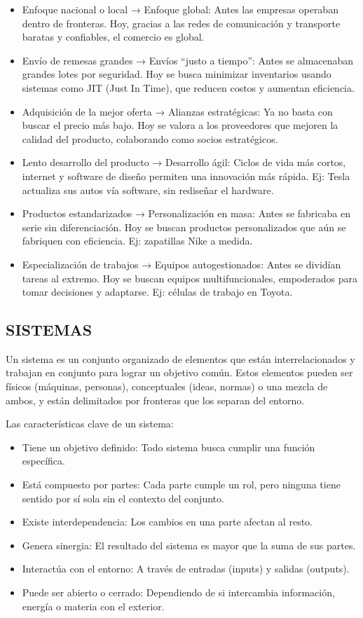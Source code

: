 \documentclass[a4paper,oneside,11pt]{article}
\begin{document}
\begin{itemize}
    \item Enfoque nacional o local → Enfoque global: Antes las empresas operaban dentro de fronteras. Hoy, gracias a las redes de comunicación y transporte baratas y confiables, el comercio es global.
    \item Envío de remesas grandes → Envíos “justo a tiempo”: Antes se almacenaban grandes lotes por seguridad. Hoy se busca minimizar inventarios usando sistemas como JIT (Just In Time), que reducen costos y aumentan eficiencia.
    \item Adquisición de la mejor oferta → Alianzas estratégicas: Ya no basta con buscar el precio más bajo. Hoy se valora a los proveedores que mejoren la calidad del producto, colaborando como socios estratégicos.
    \item Lento desarrollo del producto → Desarrollo ágil: Ciclos de vida más cortos, internet y software de diseño permiten una innovación más rápida. Ej: Tesla actualiza sus autos vía software, sin rediseñar el hardware.
    \item Productos estandarizados → Personalización en masa: Antes se fabricaba en serie sin diferenciación. Hoy se buscan productos personalizados que aún se fabriquen con eficiencia. Ej: zapatillas Nike a medida.
    \item Especialización de trabajos → Equipos autogestionados: Antes se dividían tareas al extremo. Hoy se buscan equipos multifuncionales, empoderados para tomar decisiones y adaptarse. Ej: células de trabajo en Toyota.
\end{itemize}

\subsection{SISTEMAS}
    
    Un sistema es un conjunto organizado de elementos que están interrelacionados y trabajan en conjunto para lograr un objetivo común. Estos elementos pueden ser físicos (máquinas, personas), conceptuales (ideas, normas) o una mezcla de ambos, y están delimitados por fronteras que los separan del entorno.
    
    Las características clave de un sistema:
    \begin{itemize}
        \item Tiene un objetivo definido: Todo sistema busca cumplir una función específica.
        \item Está compuesto por partes: Cada parte cumple un rol, pero ninguna tiene sentido por sí sola sin el contexto del conjunto.
        \item Existe interdependencia: Los cambios en una parte afectan al resto.
        \item Genera sinergia: El resultado del sistema es mayor que la suma de sus partes.
        \item Interactúa con el entorno: A través de entradas (inputs) y salidas (outputs).
        \item Puede ser abierto o cerrado: Dependiendo de si intercambia información, energía o materia con el exterior.
    \end{itemize}
    
\end{document}

